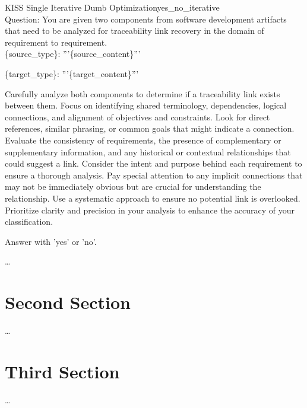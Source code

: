 \begin{prompt}{KISS Single Iterative Dumb Optimization}{yes_no_iterative}\\
    Question: You are given two components from software development artifacts that need to be analyzed for traceability link recovery in the domain of requirement to requirement.\\
    
    \{source\_type\}: '''\{source\_content\}'''

    \{target\_type\}: '''\{target\_content\}'''

    Carefully analyze both components to determine if a traceability link exists between them. Focus on identifying shared terminology, dependencies, logical connections, and alignment of objectives and constraints. Look for direct references, similar phrasing, or common goals that might indicate a connection. Evaluate the consistency of requirements, the presence of complementary or supplementary information, and any historical or contextual relationships that could suggest a link. Consider the intent and purpose behind each requirement to ensure a thorough analysis. Pay special attention to any implicit connections that may not be immediately obvious but are crucial for understanding the relationship. Use a systematic approach to ensure no potential link is overlooked. Prioritize clarity and precision in your analysis to enhance the accuracy of your classification.

    Answer with 'yes' or 'no'.
    
\end{prompt}

\begin{landscape}



\end{landscape}



\dots

\section{Second Section}
\label{sec:Evaluation:SecondSection}

\dots

\section{Third Section}
\label{sec:Evaluation:ThirdSection}

\dots
